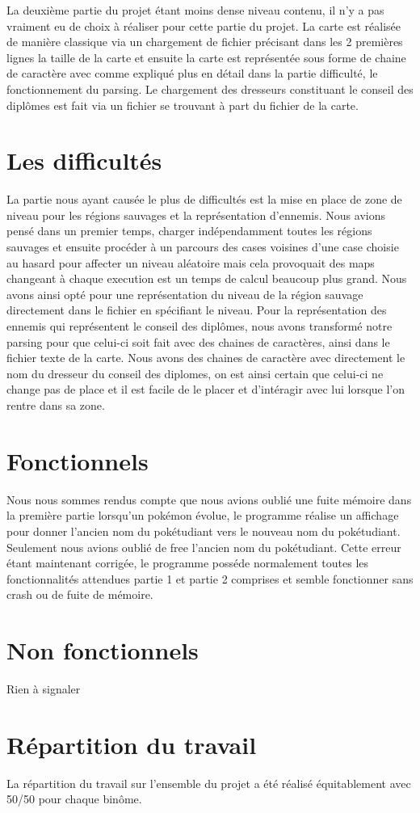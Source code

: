 \documentclass[10pt,a4paper,twocolumn]{report}
\begin{document}
La deuxième partie du projet étant moins dense niveau contenu, il n'y a pas vraiment eu de choix à réaliser pour cette partie du projet. La carte est réalisée de manière classique via un chargement de fichier précisant dans les 2 premières lignes la taille de la carte et ensuite la carte est représentée sous forme de chaine de caractère avec comme expliqué plus en détail dans la partie difficulté, le fonctionnement du parsing.
Le chargement des dresseurs constituant le conseil des diplômes est fait via un fichier se trouvant à part du fichier de la carte.

\section{Les difficultés}

La partie nous ayant causée le plus de difficultés est la mise en place de zone de niveau pour les régions sauvages et la représentation d'ennemis.
Nous avions pensé dans un premier temps, charger indépendamment toutes les régions sauvages et ensuite procéder à un parcours des cases voisines d'une case choisie au hasard pour affecter un niveau aléatoire mais cela provoquait des maps changeant à chaque execution est un temps de calcul beaucoup plus grand. Nous avons ainsi opté pour une représentation du niveau de la région sauvage directement dans le fichier en spécifiant le niveau.
Pour la représentation des ennemis qui représentent le conseil des diplômes, nous avons transformé notre parsing pour que celui-ci soit fait avec des chaines de caractères, ainsi dans le fichier texte de la carte. Nous avons des chaines de caractère avec directement le nom du dresseur du conseil des diplomes, on est ainsi certain que celui-ci ne change pas de place et il est facile de le placer et d'intéragir avec lui lorsque l'on rentre dans sa zone.

\section{Fonctionnels}
Nous nous sommes rendus compte que nous avions oublié une fuite mémoire dans la première partie lorsqu'un pokémon évolue, le programme réalise un affichage pour donner l'ancien nom du pokétudiant vers le nouveau nom du pokétudiant. Seulement nous avions oublié de free l'ancien nom du pokétudiant. Cette erreur étant maintenant corrigée, le programme posséde normalement toutes les fonctionnalités attendues partie 1 et partie 2 comprises et semble fonctionner sans crash ou de fuite de mémoire.

\section{Non fonctionnels}
Rien à signaler

\section{Répartition du travail}
La répartition du travail sur l'ensemble du projet a été réalisé équitablement avec 50/50 pour chaque binôme.
\end{document}
